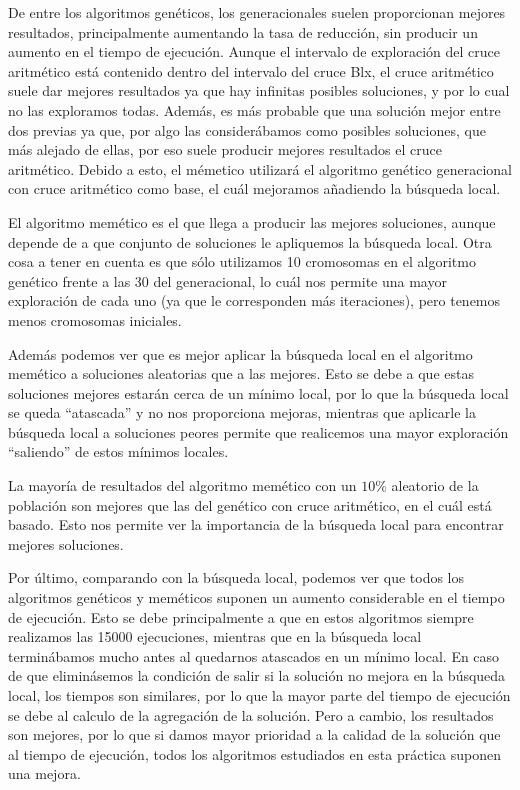 \documentclass[11pt,a4paper]{article}
\begin{document}
De entre los algoritmos genéticos, los generacionales suelen proporcionan mejores resultados, principalmente aumentando la tasa de reducción, sin producir un aumento en el tiempo de ejecución. Aunque el intervalo de exploración del cruce aritmético está contenido dentro del intervalo del cruce Blx, el cruce aritmético suele dar mejores resultados ya que hay infinitas posibles soluciones, y por lo cual no las exploramos todas. Además, es más probable que una solución mejor entre dos previas ya que, por algo las considerábamos como posibles soluciones, que más alejado de ellas, por eso suele producir mejores resultados el cruce aritmético. Debido a esto, el mémetico utilizará el algoritmo genético generacional con cruce aritmético como base, el cuál mejoramos añadiendo la búsqueda local.

El algoritmo memético es el que llega a producir las mejores soluciones, aunque depende de a que conjunto de soluciones le apliquemos la búsqueda local. Otra cosa a tener en cuenta es que sólo utilizamos 10 cromosomas en el algoritmo genético frente a las 30 del generacional, lo cuál nos permite una mayor exploración de cada uno (ya que le corresponden más iteraciones), pero tenemos menos cromosomas iniciales.

Además podemos ver que es mejor aplicar la búsqueda local en el algoritmo memético a soluciones aleatorias que a las mejores. Esto se debe a que estas soluciones mejores estarán cerca de un mínimo local, por lo que la búsqueda local se queda ``atascada'' y no nos proporciona mejoras, mientras que aplicarle la búsqueda local a soluciones peores permite que realicemos una mayor exploración ``saliendo'' de estos mínimos locales.

La mayoría de resultados del algoritmo memético con un $10\%$ aleatorio de la población son mejores que las del genético con cruce aritmético, en el cuál está basado. Esto nos permite ver la importancia de la búsqueda local para encontrar mejores soluciones.

Por último, comparando con la búsqueda local, podemos ver que todos los algoritmos genéticos y meméticos suponen un aumento considerable en el tiempo de ejecución. Esto se debe principalmente a que en estos algoritmos siempre realizamos las 15000 ejecuciones, mientras que en la búsqueda local terminábamos mucho antes al quedarnos atascados en un mínimo local. En caso de que eliminásemos la condición de salir si la solución no mejora en la búsqueda local, los tiempos son similares, por lo que la mayor parte del tiempo de ejecución se debe al calculo de la agregación de la solución. Pero a cambio, los resultados son mejores, por lo que si damos mayor prioridad a la calidad de la solución que al tiempo de ejecución, todos los algoritmos estudiados en esta práctica suponen una mejora.
\end{document}
